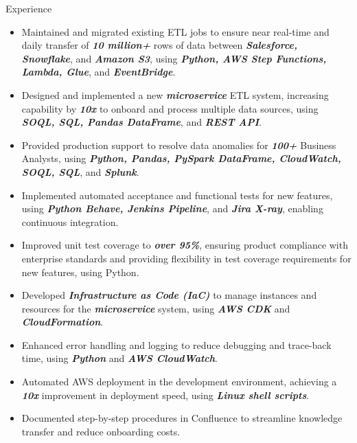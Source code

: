 \documentclass{resume} %
\begin{document}
\begin{workSection}{Experience}
      \experienceItem[
      company=Capital One,
      location=Plano{,} TX,
      position=Senior Software Engineer,
      duration=Feb. 2024 – Present
      ]
      \vspace{-0.65em}
      \begin{itemize}
            \itemsep -6pt {}
            \item Maintained and migrated existing ETL jobs to ensure near real-time and daily transfer of \textit{\textbf{10 million+}} rows of data between \textit{\textbf{Salesforce, Snowflake}}, and \textit{\textbf{Amazon S3}}, using \textit{\textbf{Python, AWS Step Functions, Lambda, Glue}}, and \textit{\textbf{EventBridge}}.
            \item Designed and implemented a new \textit{\textbf{microservice}} ETL system, increasing capability by \textit{\textbf{10x}} to onboard and process multiple data sources, using \textit{\textbf{SOQL, SQL, Pandas DataFrame}}, and \textit{\textbf{REST API}}.
            \item Provided production support to resolve data anomalies for \textit{\textbf{100+}} Business Analysts, using \textit{\textbf{Python, Pandas, PySpark DataFrame, CloudWatch, SOQL, SQL}}, and \textit{\textbf{Splunk}}.
            \item Implemented automated acceptance and functional tests for new features, using \textit{\textbf{Python Behave, Jenkins Pipeline}}, and \textit{\textbf{Jira X-ray}}, enabling continuous integration.
            \item Improved unit test coverage to \textit{\textbf{over 95\%}}, ensuring product compliance with enterprise standards and providing flexibility in test coverage requirements for new features, using Python.
            \item Developed \textit{\textbf{Infrastructure as Code (IaC)}} to manage instances and resources for the \textit{\textbf{microservice}} system, using \textit{\textbf{AWS CDK}} and \textit{\textbf{CloudFormation}}.
            \item Enhanced error handling and logging to reduce debugging and trace-back time, using \textit{\textbf{Python}} and \textit{\textbf{AWS CloudWatch}}.
            \item Automated AWS deployment in the development environment, achieving a \textit{\textbf{10x}} improvement in deployment speed, using \textit{\textbf{Linux shell scripts}}.
            \item Documented step-by-step procedures in Confluence to streamline knowledge transfer and reduce onboarding costs.
      \end{itemize}


\end{workSection}
\end{document}
